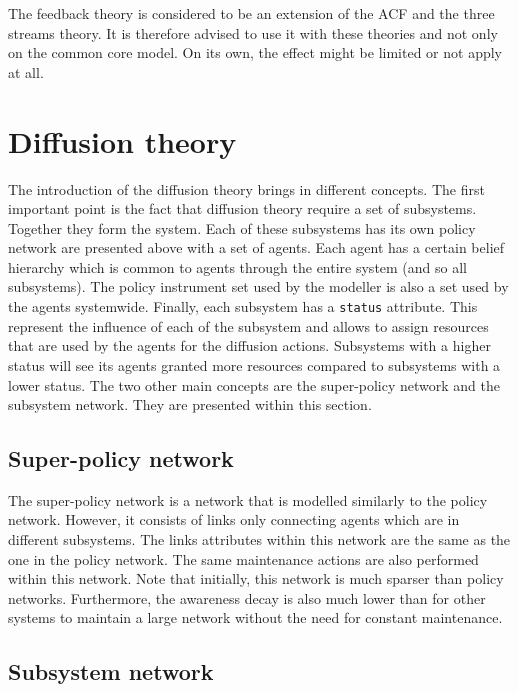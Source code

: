 The feedback theory is considered to be an extension of the ACF and the three streams theory. It is therefore advised to use it with these theories and not only on the common core model. On its own, the effect might be limited or not apply at all.

\section{Diffusion theory}

The introduction of the diffusion theory brings in different concepts. The first important point is the fact that diffusion theory require a set of subsystems. Together they form the system. Each of these subsystems has its own policy network are presented above with a set of agents. Each agent has a certain belief hierarchy which is common to agents through the entire system (and so all subsystems). The policy instrument set used by the modeller is also a set used by the agents systemwide. Finally, each subsystem has a \texttt{status} attribute. This represent the influence of each of the subsystem and allows to assign resources that are used by the agents for the diffusion actions. Subsystems with a higher status will see its agents granted more resources compared to subsystems with a lower status. The two other main concepts are the super-policy network and the subsystem network. They are presented within this section.

\subsection{Super-policy network}

The super-policy network is a network that is modelled similarly to the policy network. However, it consists of links only connecting agents which are in different subsystems. The links attributes within this network are the same as the one in the policy network. The same maintenance actions are also performed within this network. Note that initially, this network is much sparser than policy networks. Furthermore, the awareness decay is also much lower than for other systems to maintain a large network without the need for constant maintenance.

\subsection{Subsystem network}

